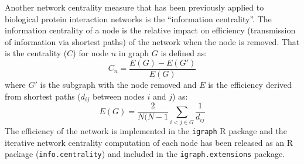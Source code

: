 Another network centrality measure that has been previously applied to biological protein interaction networks \citep{Kranthi2013} is the ``information centrality''. The information centrality of a node is the relative impact on efficiency (transmission of information via shortest paths) of the network when the node is removed. That is the centrality ($C$) \citep{Kranthi2013} for node $n$ in graph $G$ is defined as: $$C_n = \frac{E(G)-E(G')}{E(G)}$$ where $G'$ is the subgraph with the node removed and $E$ is the efficiency \citep{Latora2001} derived from shortest paths ($d_{ij}$ between nodes $i$ and $j$) as: $$E(G) = \frac{2}{N(N-1} \sum_{i<j \in G}^{} \frac{1}{d_{ij}}$$ The efficiency of the network is implemented in the \texttt{igraph} R package and the iterative network centrality computation of each node has been released as an R package (\texttt{info.centrality}) and included in the \texttt{igraph.extensions} package.


\iffalse

